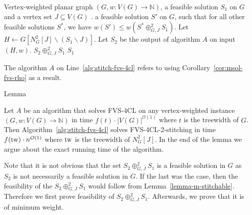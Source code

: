 \begin{algorithm}[H]
    \caption{Stitch-FVS-4CL}
    \label{alg:stitch-fvs-4cl}
    \begin{algorithmic}[1]
    \REQUIRE Vertex-weighted planar graph $(G, w:V(G) \to \mathbb{N})$, a feasible solution $S_1$ on $G$
    and a vertex set $J \subseteq V(G)$
    .
    \ENSURE a feasible solution $S'$ on $G$, such that for all other feasible solutions $S^{*}$, 
    we have $w(S') \leq w(S^{*} \oplus^{2}_{G,J} S_1)$. 
    \STATE Let $H \leftarrow G[N^{2}_{G}[J] \backslash (S_1 \backslash J)]$. \label{state:construct-H}
    \STATE Let $S_2$ be the output of algorithm $A$ on input $(H, w)$. \label{state:opt-solution}
        \RETURN $S_2 \oplus^{2}_{G,J} S_1$
    \ELSE
        \RETURN $S_1$
    \ENDIF
    \end{algorithmic}
\end{algorithm}

The algorithm $A$ on Line~\ref{alg:stitch-fvs-4cl} refers to using 
Corollary~\ref{cor:msol-fvs-rho} as a result.

\begin{mydefinition}{Lemma}
    \label{lemma-stictch-fvs-4cl}

    Let $A$ be an algorithm that solves FVS-4CL on any vertex-weighted instance $(G, w : V(G) \to \mathbb{N})$
    in time $f(t) \cdot |V(G)|^{\mathcal{O}(1)}$ where $t$ is the treewidth of $G$. 
    Then Algorithm~\ref{alg:stitch-fvs-4cl} solves 
    FVS-4CL-2-stitching in time $f(\operatorname{tw}) \cdot n^{\mathcal{O}(1)}$ where 
    $\operatorname{tw}$ is the treewidth of $N^{2}_{G}[J]$. 
    In the end of the lemma we argue about the exact running time of the algorithm.
    
\end{mydefinition}

Note that it is not obvious that the set $S_2 \oplus^{2}_{G,J} S_1$ is a feasible solution in $G$ as $S_2$ is not 
necessarily a feasible solution in $G$. If the last was the case, then the feasibility of the 
$S_2 \oplus^{2}_{G,J} S_1$ would follow from Lemma~\ref{lemma-m-stitchable}. Therefore we first prove 
feasibility of $S_2 \oplus^{2}_{G,J} S_1$. Afterwards, we prove that it is of minimum weight.

